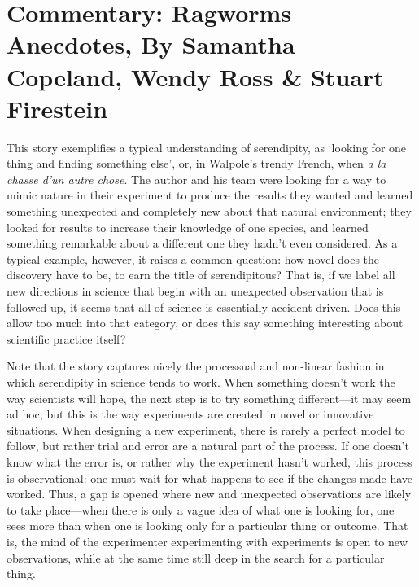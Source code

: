 \documentclass[authordate, empirical]{jote-new-article}
\author[1]{\mbox{Samantha Copeland\orcid{0000-0002-6946-7165}}}
\affil[1]{Delft University of Technology}
\begin{document}
\begin{frontmatter}
  \maketitle
  \begin{abstract}
    \printabstracttext
  \end{abstract}
\end{frontmatter}


	\section{Commentary: Ragworms Anecdotes, By Samantha Copeland, Wendy Ross \& Stuart Firestein}



	This story exemplifies a typical understanding of serendipity, as ‘looking for one thing and finding something else', or, in Walpole's trendy French, when \emph{a la chasse d'un autre chose}. The author and his team were looking for a way to mimic nature in their experiment to produce the results they wanted and learned something unexpected and completely new about that natural environment; they looked for results to increase their knowledge of one species, and learned something remarkable about a different one they hadn't even considered. As a typical example, however, it raises a common question: how novel does the discovery have to be, to earn the title of serendipitous? That is, if we label all new directions in science that begin with an unexpected observation that is followed up, it seems that all of science is essentially accident-driven. Does this allow too much into that category, or does this say something interesting about scientific practice itself?



	Note that the story captures nicely the processual and non-linear fashion in which serendipity in science tends to work. When something doesn't work the way scientists will hope, the next step is to try something different—it may seem ad hoc, but this is the way experiments are created in novel or innovative situations. When designing a new experiment, there is rarely a perfect model to follow, but rather trial and error are a natural part of the process. If one doesn't know what the error is, or rather why the experiment hasn't worked, this process is observational: one must wait for what happens to see if the changes made have worked. Thus, a gap is opened where new and unexpected observations are likely to take place—when there is only a vague idea of what one is looking for, one sees more than when one is looking only for a particular thing or outcome. That is, the mind of the experimenter experimenting with experiments is open to new observations, while at the same time still deep in the search for a particular thing.
\end{document}
